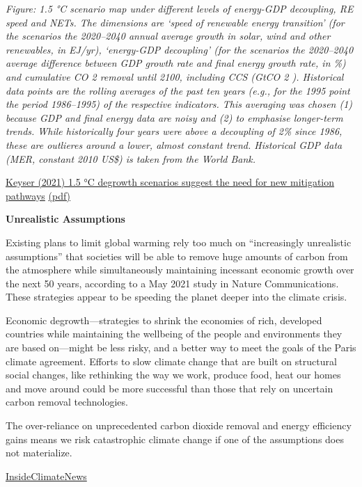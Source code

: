 \documentclass[
]{book}
\begin{document}
\emph{Figure: 1.5 °C scenario map under different levels of energy-GDP decoupling, RE speed and NETs.
The dimensions are `speed of renewable energy transition'
(for the scenarios the 2020--2040 annual average growth in solar, wind and other renewables, in EJ/yr),
`energy-GDP decoupling' (for the scenarios the 2020--2040 average difference between GDP growth rate and final energy growth rate, in \%) and cumulative CO 2 removal until 2100,
including CCS (GtCO 2 ).
Historical data points are the rolling averages of the past ten years (e.g., for the 1995 point the period 1986--1995) of the respective indicators.
This averaging was chosen (1) because GDP and final energy data are noisy and (2) to emphasise longer-term trends.
While historically four years were above a decoupling of 2\% since 1986, these are outlieres around a lower, almost constant trend.
Historical GDP data (MER, constant 2010 US\$) is taken from the World Bank.}

\href{https://www.nature.com/articles/s41467-021-22884-9}{Keyser (2021) 1.5 °C degrowth scenarios suggest the need for new mitigation pathways}
\href{pdf/Keyser_2021_New_Mitigation_Pathways.pdf}{(pdf)}

\textbf{Unrealistic Assumptions}

Existing plans to limit global warming rely too much on ``increasingly unrealistic assumptions'' that societies will be able to remove huge amounts of carbon from the atmosphere while simultaneously maintaining incessant economic growth over the next 50 years, according to a May 2021 study in Nature Communications. These strategies appear to be speeding the planet deeper into the climate crisis.

Economic degrowth---strategies to shrink the economies of rich, developed countries while maintaining the wellbeing of the people and environments they are based on---might be less risky, and a better way to meet the goals of the Paris climate agreement. Efforts to slow climate change that are built on structural social changes, like rethinking the way we work, produce food, heat our homes and move around could be more successful than those that rely on uncertain carbon removal technologies.

The over-reliance on unprecedented carbon dioxide removal and energy efficiency gains means we risk catastrophic climate change if one of the assumptions does not materialize.

\href{https://insideclimatenews.org/news/18062021/degrowth-economies-climate-change-technology-gdp/}{InsideClimateNews}
\end{document}
